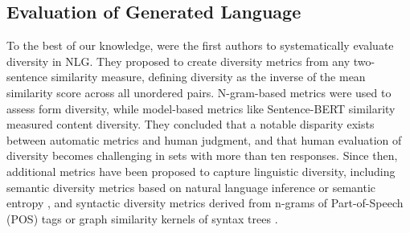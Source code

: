 \documentclass[11pt,a4paper]{article}
\begin{document}
\smallskip

\subsection{Evaluation of Generated Language}
To the best of our knowledge, \citet{tevet-berant-2021-evaluating} were the first authors to systematically evaluate diversity in NLG.	
They proposed to create diversity metrics from any two-sentence similarity measure, defining diversity as the inverse of the mean similarity score across all unordered pairs.		
N-gram-based metrics were used to assess form diversity, while model-based metrics like Sentence-BERT similarity measured content diversity.		
They concluded that a notable disparity exists between automatic metrics and human judgment, and that human evaluation of diversity becomes challenging in sets with more than ten responses.		
Since then, additional metrics have been proposed to capture linguistic diversity, including semantic diversity metrics based on natural language inference \citep{stasaski-hearst-2022-semantic} or semantic entropy \citep{han-etal-2022-measuring}, and syntactic diversity metrics derived from n-grams of Part-of-Speech (POS) tags \citep{giulianelli-etal-2023-comes} or graph similarity kernels of syntax trees \citep{guo-etal-2024-curious}.


\end{document}
